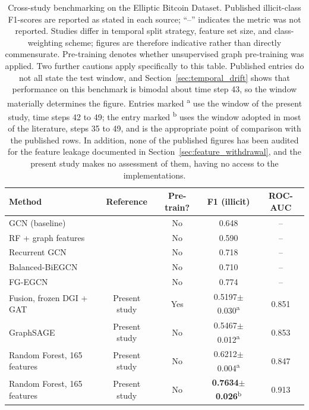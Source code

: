 \documentclass[12pt,a4paper]{article}
\begin{document}
\begin{table}[htbp]
  \caption{Cross-study benchmarking on the Elliptic Bitcoin
    Dataset. Published illicit-class F1-scores are reported
    as stated in each source; ``--'' indicates the metric was
    not reported. Studies differ in temporal split strategy,
    feature set size, and class-weighting scheme; figures
    are therefore indicative rather than directly
    commensurate. Pre-training denotes whether unsupervised
    graph pre-training was applied.
    Two further cautions apply specifically to this table.
    Published entries do not all state the test window, and
    Section~\ref{sec:temporal_drift} shows that performance on
    this benchmark is bimodal about time step 43, so the window
    materially determines the figure. Entries marked
    \textsuperscript{a} use the window of the present study,
    time steps 42 to 49; the entry marked \textsuperscript{b}
    uses the window adopted in most of the literature, steps 35
    to 49, and is the appropriate point of comparison with the
    published rows. In addition, none of the published figures
    has been audited for the feature leakage documented in
    Section~\ref{sec:feature_withdrawal}, and the present study
    makes no assessment of them, having no access to the
    implementations.}
  \label{tab:benchmark}
  \centering
  \small
  \setlength{\tabcolsep}{5pt}
  \begin{tabular}{lcccc}
    \toprule
    \textbf{Method} & \textbf{Reference}
      & \textbf{Pre-train?}
      & \textbf{F1 (illicit)}
      & \textbf{ROC-AUC} \\
    \midrule
    GCN (baseline)
      & \citet{weber2019} & No  & 0.648 & -- \\
    RF + graph features
      & \citet{weber2019} & No  & 0.590 & -- \\
    Recurrent GCN
      & \citet{alarab2024} & No  & 0.718 & -- \\
    Balanced-BiEGCN
      & \citet{xiao2025} & No  & 0.710 & -- \\
    FG-EGCN
      & \citet{han2026fg} & No  & 0.774 & -- \\
    \midrule
    Fusion, frozen DGI + GAT
      & Present study & Yes & 0.5197$\pm$0.030\textsuperscript{a} & 0.851 \\
    GraphSAGE
      & Present study & No  & 0.5467$\pm$0.012\textsuperscript{a} & 0.853 \\
    Random Forest, 165 features
      & Present study & No  & 0.6212$\pm$0.004\textsuperscript{a} & 0.847 \\
    Random Forest, 165 features
      & Present study & No  & \textbf{0.7634$\pm$0.026}\textsuperscript{b} & 0.913 \\
    \bottomrule
  \end{tabular}
\end{table}
\end{document}
